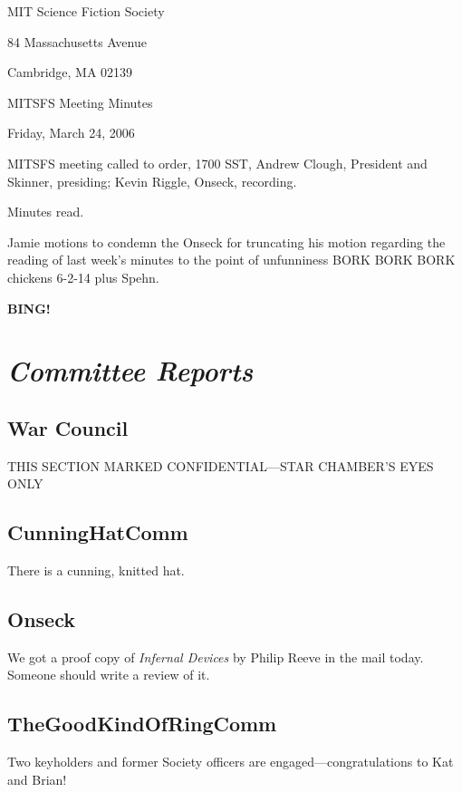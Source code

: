 \documentclass[10pt]{article}
\newcommand{\bing}{{\bf BING!} }
\newcommand{\goto}[1]{\bing \vskip 12pt \section*{{\em{#1}}}}
\newcommand{\ps}{ plus Spehn\xspace}
\begin{document}
\begin{center}

MIT Science Fiction Society

84 Massachusetts Avenue

Cambridge, MA 02139

\vspace{12pt}

MITSFS Meeting Minutes

Friday, March 24, 2006

\end{center}

\vspace{18pt}

\setlength{\parskip}{6pt}

\noindent
MITSFS meeting called to order, 1700 SST,
Andrew Clough, President and Skinner, presiding; Kevin Riggle, Onseck, recording.

Minutes read.

Jamie motions to condemn the Onseck for truncating his motion regarding the reading of last week's
minutes to the point of unfunniness BORK BORK BORK chickens 6-2-14\ps.

\goto{Committee Reports}

\subsection*{War Council}

THIS SECTION MARKED CONFIDENTIAL---STAR CHAMBER'S EYES ONLY

\subsection*{CunningHatComm}
There is a cunning, knitted hat.

\subsection*{Onseck}
We got a proof copy of \emph{Infernal Devices} by Philip Reeve in the mail today.  Someone should
write a review of it.

\subsection*{TheGoodKindOfRingComm}
Two keyholders and former Society officers are engaged---congratulations to Kat and Brian!

\end{document}

